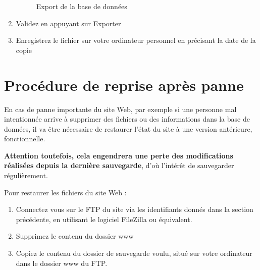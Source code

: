 \documentclass[11pt]{report}
\begin{document}
\begin{enumerate}
\begin{figure}[H] 
\caption{Export de la base de données}
\end{figure}

\item Validez en appuyant sur \og Exporter \fg{}
\item Enregistrez le fichier sur votre ordinateur personnel en précisant la
date de la copie
\end{enumerate}

\section{Procédure de reprise après panne}
En cas de panne importante du site Web, par exemple si une personne mal
intentionnée arrive à supprimer des fichiers ou des informations dans la base de
données, il va être nécessaire de restaurer l'état du site à une version
antérieure, fonctionnelle. \\
\par \textbf{Attention toutefois, cela engendrera une perte
des modifications réalisées depuis la dernière sauvegarde}, d'où l'intérêt de
sauvegarder régulièrement. \\

\par Pour restaurer les fichiers du site Web : 
\begin{enumerate}
\item Connectez vous sur le FTP du site via les identifiants donnés dans la
section précédente, en utilisant le logiciel FileZilla ou équivalent.
\item Supprimez le contenu du dossier \og www \fg{}
\item Copiez le contenu du dossier de sauvegarde voulu, situé sur votre
ordinateur dans le dossier \og www \fg{} du FTP. \\
\end{enumerate} 
\end{document}
